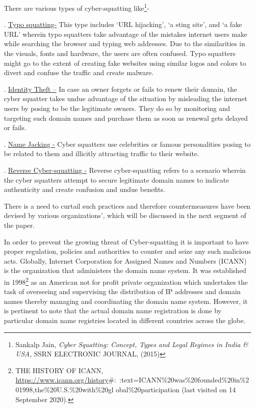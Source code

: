 \begin{multicols}{2}
\noi
There are various types of cyber-squatting like\footnote{Sankalp Jain, \textit{Cyber Squatting: Concept, Types and Legal Regimes in India \& USA,} SSRN ELECTRONIC JOURNAL, (2015)}-

. \underline{Typo squatting-} This type includes ‘URL hijacking’, ‘a sting site’, and ‘a fake URL’
wherein typo squatters take advantage of the mistakes internet users make while searching
the browser and typing web addresses. Due to the similarities in the visuals, fonts and
hardware, the users are often confused. Typo squatters might go to the extent of creating fake
websites using similar logos and colors to divert and confuse the traffic and create malware.

. \underline{Identity Theft –} In case an owner forgets or fails to renew their domain, the cyber squatter
takes undue advantage of the situation by misleading the internet users by posing to be the
legitimate owners. They do so by monitoring and targeting such domain names and purchase
them as soon as renewal gets delayed or fails.

. \underline{Name Jacking -} Cyber squatters use celebrities or famous personalities posing to be related
to them and illicitly attracting traffic to their website.

. \underline{Reverse Cyber-squatting -} Reverse cyber-squatting refers to a scenario wherein the cyber
squatters attempt to secure legitimate domain names to indicate authenticity and create
confusion and undue benefits.

\noi
There is a need to curtail such practices and therefore countermeasures have been devised by
various organizations’, which will be discussed in the next segment of the paper.


\noi
In order to prevent the growing threat of Cyber-squatting it is important to have proper
regulation, policies and authorities to counter and seize any such malicious acts. Globally,
Internet Corporation for Assigned Names and Numbers (ICANN) is the organization that
administers the domain name system. It was established in 1998\footnote{THE HISTORY OF ICANN, \url{https://www.icann.org/history}\#:~:text=ICANN\%20was\%20founded\%20in\%201998,the\%20U.S.\%20with\%20gl obal\%20participation (last visited on 14 September 2020).} as an American not for profit private organization which undertakes the task of overseeing and supervising the
distribution of IP addresses and domain names thereby managing and coordinating the
domain name system. However, it is pertinent to note that the actual domain name
registration is done by particular domain name registries located in different countries across
the globe.


\end{multicols}
